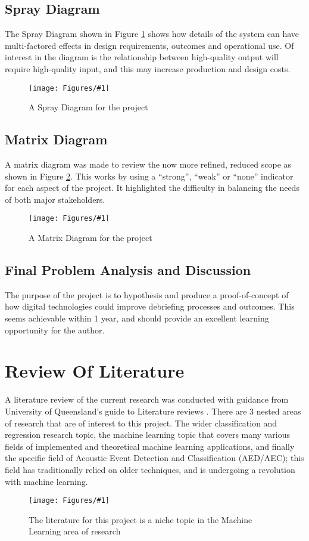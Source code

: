\documentclass{UoNMCHA}
\newcommand{\fref}[1] {Figure \ref{#1}}
\newcommand{\fFigure}[3]{
	\begin{figure}[h]
        \begin{center}  
            \texttt{[image: Figures/\#1]}  
            \caption{#2}
            \label{#1}
        \end{center}
	\end{figure}
}
\numberwithin{equation}{section}
\begin{document}
\subsection{Spray Diagram}
The Spray Diagram shown in \fref{SprayDiagram.png} shows how details of the system can have multi-factored effects in design requirements, outcomes and operational use. Of interest in the diagram is the relationship between high-quality output will require high-quality input, and this may increase production and design costs. 
\fFigure{SprayDiagram.png}{A Spray Diagram for the project}{1}

\subsection{Matrix Diagram}
A matrix diagram was made to review the now more refined, reduced scope as shown in \fref{MatrixDiagram.png}. This works by using a “strong”, “weak” or “none” indicator for each aspect of the project. It highlighted the difficulty in balancing the needs of both major stakeholders. 
\fFigure{MatrixDiagram.png}{A Matrix Diagram for the project}{0.8}

\subsection{Final Problem Analysis and Discussion}
The purpose of the project is to hypothesis and produce a proof-of-concept of how digital technologies could improve debriefing processes and outcomes. This seems achievable within 1 year, and should provide an excellent learning opportunity for the author.

\section{Review Of Literature}
A literature review of the current research was conducted with guidance from University of Queensland’s guide to Literature reviews \cite{QueenslandReview} . There are 3 nested areas of research that are of interest to this project. The wider classification and regression research topic, the machine learning topic that covers many various fields of implemented and theoretical machine learning applications, and finally the specific field of Acoustic Event Detection and Classification (AED/AEC); this field has traditionally relied on older techniques, and is undergoing a revolution with machine learning. 
\fFigure{niche.png}{The literature for this project is a niche topic in the Machine Learning area of research}{0.8}
\end{document}
